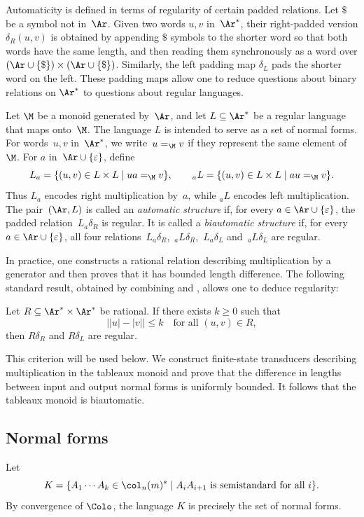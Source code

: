 \documentclass[a4paper, twoside, 11pt, english]{article}
\begin{document}
Automaticity is defined in terms of regularity of certain padded relations.
Let $\$$ be a symbol not in~$\Ar$.
Given two words $u,v$ in~$\Ar^*$,
their right-padded version $\delta_R(u,v)$
is obtained by appending $\$$ symbols to the shorter word
so that both words have the same length,
and then reading them synchronously as a word over
$(\Ar\cup\{\$\})\times(\Ar\cup\{\$\})$.
Similarly, the left padding map $\delta_L$
pads the shorter word on the left.
These padding maps allow one to reduce questions about
binary relations on $\Ar^*$ to questions about regular languages.


Let $\M$ be a monoid generated by~$\Ar$,
and let $L\subseteq\Ar^*$ be a regular language
that maps onto~$\M$.
The language $L$ is intended to serve as a set of normal forms.
For words~$u,v$ in~$\Ar^*$, we write~$u=_\M v$ if they
represent the same element of~$\M$.
For $a$ in~$\Ar\cup\{\varepsilon\}$, define
\[
L_a=\{(u,v)\in L\times L \mid ua=_\M v\},
\qquad
{}_aL=\{(u,v)\in L\times L \mid au=_\M v\}.
\]
Thus $L_a$ encodes right multiplication by~$a$,
while ${}_aL$ encodes left multiplication.
The pair~$(\Ar,L)$ is called an \emph{automatic structure} if, for every
$a\in\Ar\cup\{\varepsilon\}$, the padded relation~$L_a\delta_R$ is regular.
It is called a \emph{biautomatic structure} if, for every
$a\in\Ar\cup\{\varepsilon\}$, all four relations~$L_a\delta_R$,~${}_aL\delta_R$,~$
L_a\delta_L$ and~${}_aL\delta_L$ are regular.

In practice, one constructs a rational relation describing
multiplication by a generator and then proves that it has bounded
length difference.
The following standard result, obtained by combining
\cite[Corollary~2.5]{FS93} and \cite[Proposition~4]{HT05},
allows one to deduce regularity:

\begin{proposition}
\label{prop:rational-to-regular}
Let $R\subseteq \Ar^*\times\Ar^*$ be rational.
If there exists $k\ge0$ such that
\[
\bigl||u|-|v|\bigr| \le k
\quad\text{for all } (u,v)\in R,
\]
then $R\delta_R$ and $R\delta_L$ are regular.
\end{proposition}

This criterion will be used below.
We construct finite-state transducers describing multiplication
in the tableaux monoid and prove that the difference in lengths
between input and output normal forms is uniformly bounded.
It follows that the tableaux monoid is biautomatic.

\subsection{Normal forms}
Let
\[
K=\{A_1\cdots A_k\in \col_n(m)^*
\mid A_iA_{i+1}\text{ is semistandard for all }i\}.
\]
By convergence of $\Colo$,
the language $K$ is precisely the set of normal forms.
\end{document}
